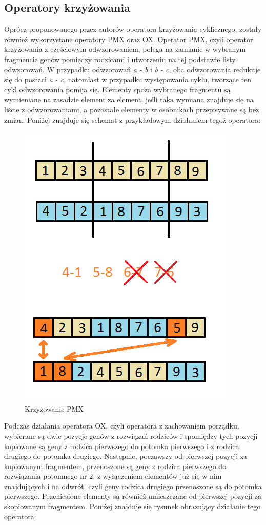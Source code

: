 \subsection{Operatory krzyżowania}
Oprócz proponowanego przez autorów operatora krzyżowania cyklicznego, zostały również wykorzystane operatory PMX oraz OX.
Operator PMX, czyli operator krzyżowania z częściowym odwzorowaniem, polega na zamianie w wybranym fragmencie genów pomiędzy rodzicami i utworzeniu na tej podstawie listy odwzorowań. W przypadku odwzorowań \textit{a - b} i \textit{b - c}, oba odwzorowania redukuje się do postaci \textit{a - c}, natomiast w przypadku występowania cyklu, tworzące ten cykl odwzorowania pomija się. Elementy spoza wybranego fragmentu są wymieniane na zasadzie element za element, jeśli taka wymiana znajduje się na liście z odwzorowaniami, a pozostałe elementy w osobnikach przepisywane są bez zmian. Poniżej znajduje się schemat z przykładowym działaniem tegoż operatora:
\newpage
\begin{figure}[t]
\includegraphics[scale=1]{pmx}
\caption{Krzyżowanie PMX}
\end{figure}

Podczas działania operatora OX, czyli operatora z zachowaniem porządku, wybierane są dwie pozycje genów z rozwiązań rodziców i spomiędzy tych pozycji kopiowane są geny z rodzica pierwszego do potomka pierwszego i z rodzica drugiego do potomka drugiego. Następnie, począwszy od pierwszej pozycji za kopiowanym fragmentem, przenoszone są geny z rodzica pierwszego do rozwiązania potomnego nr 2, z wyłączeniem elementów już się w nim znajdujących i na odwrót, czyli geny rodzica drugiego przenoszone są do potomka pierwszego. Przeniesione elementy są również umieszczane od pierwszej pozycji za skopiowanym fragmentem. Poniżej znajduje się rysunek obrazujący działanie tego operatora:

